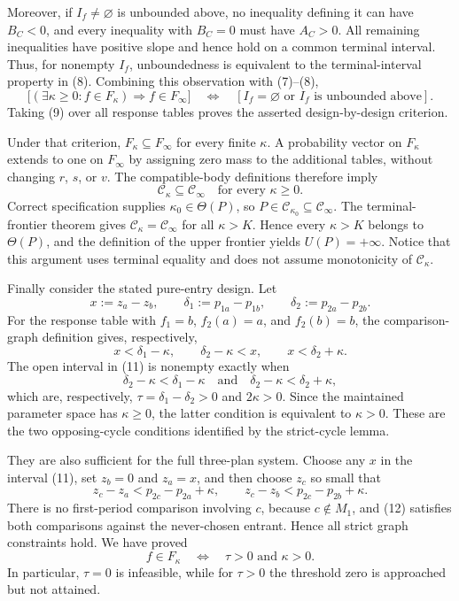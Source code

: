 Moreover, if \(I_f\ne\varnothing\) is unbounded above, no inequality defining it can have \(B_C<0\), and every inequality with \(B_C=0\) must have \(A_C>0\).  All remaining inequalities have positive slope and hence hold on a common terminal interval.  Thus, for nonempty \(I_f\), unboundedness is equivalent to the terminal-interval property in (8).  Combining this observation with (7)--(8),
\[
 \bigl[(\exists\kappa\ge0:f\in F_\kappa)\Longrightarrow f\in F_\infty\bigr]
 \quad\Longleftrightarrow\quad
 [I_f=\varnothing\text{ or }I_f\text{ is unbounded above}].
\tag{9}
\]
Taking (9) over all response tables proves the asserted design-by-design criterion.

Under that criterion, \(F_\kappa\subseteq F_\infty\) for every finite \(\kappa\).  A probability vector on \(F_\kappa\) extends to one on \(F_\infty\) by assigning zero mass to the additional tables, without changing \(r\), \(s\), or \(v\).  The compatible-body definitions therefore imply
\[
 \mathcal C_\kappa\subseteq\mathcal C_\infty
 \quad\text{for every }\kappa\ge0.
\tag{10}
\]
Correct specification supplies \(\kappa_0\in\Theta(P)\), so \(P\in\mathcal C_{\kappa_0}\subseteq\mathcal C_\infty\).  The terminal-frontier theorem gives \(\mathcal C_\kappa=\mathcal C_\infty\) for all \(\kappa>K\).  Hence every \(\kappa>K\) belongs to \(\Theta(P)\), and the definition of the upper frontier yields \(U(P)=+\infty\).  Notice that this argument uses terminal equality and does not assume monotonicity of \(\mathcal C_\kappa\).

Finally consider the stated pure-entry design.  Let
\[
 x:=z_a-z_b,
 \qquad
 \delta_1:=p_{1a}-p_{1b},
 \qquad
 \delta_2:=p_{2a}-p_{2b}.
\]
For the response table with \(f_1=b\), \(f_2(a)=a\), and \(f_2(b)=b\), the comparison-graph definition gives, respectively,
\[
 x<\delta_1-\kappa,
 \qquad
 \delta_2-\kappa<x,
 \qquad
 x<\delta_2+\kappa.
\tag{11}
\]
The open interval in (11) is nonempty exactly when
\[
 \delta_2-\kappa<\delta_1-\kappa
 \quad\text{and}\quad
 \delta_2-\kappa<\delta_2+\kappa,
\]
which are, respectively, \(\tau=\delta_1-\delta_2>0\) and \(2\kappa>0\).  Since the maintained parameter space has \(\kappa\ge0\), the latter condition is equivalent to \(\kappa>0\).  These are the two opposing-cycle conditions identified by the strict-cycle lemma.

They are also sufficient for the full three-plan system.  Choose any \(x\) in the interval (11), set \(z_b=0\) and \(z_a=x\), and then choose \(z_c\) so small that
\[
 z_c-z_a<p_{2c}-p_{2a}+\kappa,
 \qquad
 z_c-z_b<p_{2c}-p_{2b}+\kappa.
\tag{12}
\]
There is no first-period comparison involving \(c\), because \(c\notin M_1\), and (12) satisfies both comparisons against the never-chosen entrant.  Hence all strict graph constraints hold.  We have proved
\[
 f\in F_\kappa
 \quad\Longleftrightarrow\quad
 \tau>0\text{ and }\kappa>0.
\]
In particular, \(\tau=0\) is infeasible, while for \(\tau>0\) the threshold zero is approached but not attained.

